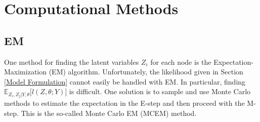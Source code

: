 \documentclass{article}
\begin{document}


\section{Computational Methods} \label{Computational Methods}

\subsection{EM}
One method for finding the latent variables $Z_i$ for each node is the Expectation-Maximization (EM) algorithm. Unfortunately, the likelihood given in Section \ref{Model Formulation} cannot easily be handled with EM. In particular, finding $\mathbb{E}_{Z_i, Z_j | Y, \theta}\Big[l(Z, \theta ; Y)\Big]$ is difficult. One solution is to sample and use Monte Carlo methods to estimate the expectation in the E-step and then proceed with the M-step. This is the so-called Monte Carlo EM (MCEM) method. 
\end{document}
